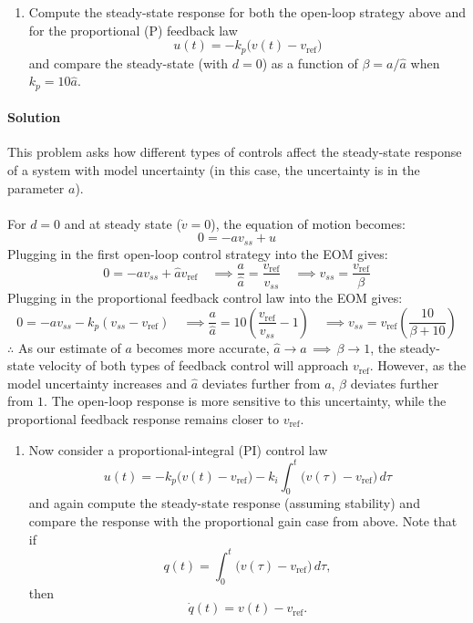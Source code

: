 \documentclass[11pt]{article}
\begin{document}
\begin{enumerate}
    \item[(a)] Compute the steady-state response for both the open-loop strategy above and for the proportional (P) feedback law
    \[
    u(t)=-k_p\bigl(v(t)-v_{\mathrm{ref}}\bigr)
    \]
    and compare the steady-state (with $d=0$) as a function of $\beta=a/\hat{a}$ when $k_p=10\hat{a}$.
    \end{enumerate}
\paragraph{Solution} This problem asks how different types of controls affect the steady-state response of a system with model uncertainty (in this case, the uncertainty is in the parameter \(a\)).\\\\
For $d=0$ and at steady state ($\dot{v} = 0$), the equation of motion becomes:
\[0=-av_{ss}+u\]
Plugging in the first open-loop control strategy into the EOM gives:
\[0 = -av_{ss}+\hat{a}v_{\mathrm{ref}}\quad \implies \frac{a}{\hat{a}} = \frac{v_{\mathrm{ref}}}{v_{ss}}\quad \implies \boxed{v_{ss}= \frac{v_{\mathrm{ref}}}{\beta}}\]
Plugging in the proportional feedback control law into the EOM gives:
\[0=-av_{ss}-k_p(v_{ss}-v_{\mathrm{ref}}) \quad \implies \frac{a}{\hat{a}} = 10\left(\frac{v_{\mathrm{ref}}}{v_{ss}}-1\right) \quad \implies \boxed{v_{ss} = v_{\mathrm{ref}}\left(\frac{10}{\beta + 10}\right)}\]
$\therefore$ As our estimate of $a$ becomes more accurate, $\hat{a} \to a \, \implies \, \beta \to 1$, the steady-state velocity of both types of feedback control will approach $v_{\mathrm{ref}}$. However, as the model uncertainty increases and $\hat{a}$ deviates
further from $a$, $\beta$ deviates further from $1$. The open-loop
response is more sensitive to this uncertainty, while the proportional feedback response remains closer to $v_{\mathrm{ref}}$.

\begin{enumerate}
    \item[(b)] Now consider a proportional-integral (PI) control law
    \[
    u(t)=-k_p\bigl(v(t)-v_{\mathrm{ref}}\bigr)
    -k_i\int_0^t \bigl(v(\tau)-v_{\mathrm{ref}}\bigr)\,d\tau
    \]
    and again compute the steady-state response (assuming stability) and compare the response with the proportional gain case from above. Note that if
    \[
    q(t)=\int_0^t \bigl(v(\tau)-v_{\mathrm{ref}}\bigr)\,d\tau,
    \]
    then
    \[
    \dot{q}(t)=v(t)-v_{\mathrm{ref}}.
    \]
\end{enumerate}
\end{document}
